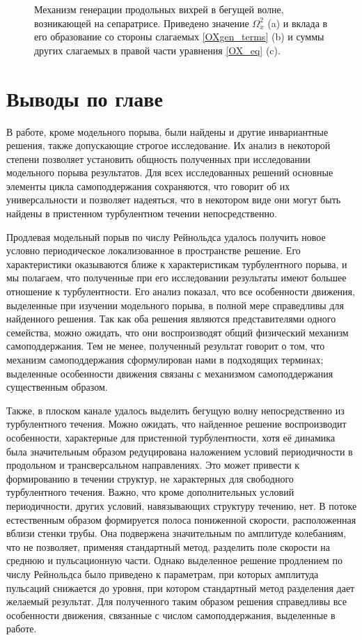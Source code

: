 \begin{figure}
\caption{Механизм генерации продольных вихрей в бегущей волне, возникающей на сепаратрисе. Приведено значение $\Omega_x^2$ (a) и вклада в его образование со стороны слагаемых \eqref{OXgen_terms} (b) и суммы других слагаемых в правой части уравнения \eqref{OX_eq} (c).}
\label{duct_edge_tw_OXgen_pic}
\end{figure}


\section{Выводы по главе}

В работе, кроме модельного порыва, были найдены и другие инвариантные решения, также допускающие строгое исследование. Их анализ в некоторой степени позволяет установить общность полученных при исследовании модельного порыва результатов. Для всех исследованных решений основные элементы цикла самоподдержания сохраняются, что говорит об их универсальности и позволяет надеяться, что в некотором виде они могут быть найдены в пристенном турбулентном течении непосредственно. 

Продлевая модельный порыв по числу Рейнольдса удалось получить новое условно периодическое локализованное в пространстве решение. Его характеристики оказываются ближе к характеристикам турбулентного порыва, и мы полагаем, что полученные при его исследовании результаты имеют большее отношение к турбулентности. Его анализ показал, что все особенности движения, выделенные при изучении модельного порыва, в полной мере справедливы для найденного решения. Так как оба решения являются представителями одного семейства, можно ожидать, что они воспроизводят общий физический механизм самоподдержания. Тем не менее, полученный результат говорит о том, что механизм самоподдержания сформулирован нами в подходящих терминах; выделенные особенности движения связаны с механизмом самоподдержания существенным образом. 

Также, в плоском канале удалось выделить бегущую волну непосредственно из турбулентного течения. Можно ожидать, что найденное решение воспроизводит особенности, характерные для пристенной турбулентности, хотя её динамика была значительным образом редуцирована наложением условий периодичности в продольном и трансверсальном направлениях. Это может привести к формированию в течении структур, не характерных для свободного турбулентного течения. Важно, что кроме дополнительных условий периодичности, других условий, навязывающих структуру течению, нет. В потоке естественным образом формируется полоса пониженной скорости, расположенная вблизи стенки трубы. Она подвержена значительным по амплитуде колебаниям, что не позволяет, применяя стандартный метод, разделить поле скорости на среднюю и пульсационную части. Однако выделенное решение продлением по числу Рейнольдса было приведено к параметрам, при которых амплитуда пульсаций снижается до уровня, при котором стандартный метод разделения дает желаемый результат. Для полученного таким образом решения справедливы все особенности движения, связанные с числом самоподдержания, выделенные в работе.

